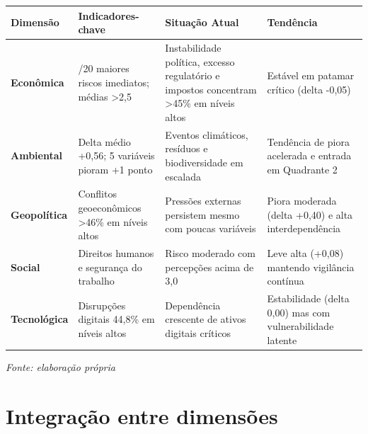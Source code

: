 \documentclass[
  portuguese,
  letterpaper,
  DIV=11,
  numbers=noendperiod]{scrreprt}
\begin{document}
\begin{longtable}[]{@{}
  >{\raggedright\arraybackslash}p{}
  >{\raggedright\arraybackslash}p{}
  >{\raggedright\arraybackslash}p{}
  >{\raggedright\arraybackslash}p{}@{}}
\toprule\noalign{}
\begin{minipage}[b]{\linewidth}\raggedright
\textbf{Dimensão}
\end{minipage} & \begin{minipage}[b]{\linewidth}\raggedright
\textbf{Indicadores-chave}
\end{minipage} & \begin{minipage}[b]{\linewidth}\raggedright
\textbf{Situação Atual}
\end{minipage} & \begin{minipage}[b]{\linewidth}\raggedright
\textbf{Tendência}
\end{minipage} \\
\midrule\noalign{}
\endhead
\bottomrule\noalign{}
\endlastfoot
\textbf{Econômica} & 13/20 maiores riscos imediatos; médias
\textgreater2,5 & Instabilidade política, excesso regulatório e impostos
concentram \textgreater45\% em níveis altos & Estável em patamar crítico
(delta -0,05) \\
\textbf{Ambiental} & Delta médio +0,56; 5 variáveis pioram +1 ponto &
Eventos climáticos, resíduos e biodiversidade em escalada & Tendência de
piora acelerada e entrada em Quadrante 2 \\
\textbf{Geopolítica} & Conflitos geoeconômicos \textgreater46\% em
níveis altos & Pressões externas persistem mesmo com poucas variáveis &
Piora moderada (delta +0,40) e alta interdependência \\
\textbf{Social} & Direitos humanos e segurança do trabalho & Risco
moderado com percepções acima de 3,0 & Leve alta (+0,08) mantendo
vigilância contínua \\
\textbf{Tecnológica} & Disrupções digitais 44,8\% em níveis altos &
Dependência crescente de ativos digitais críticos & Estabilidade (delta
0,00) mas com vulnerabilidade latente \\
\end{longtable}

\emph{Fonte: elaboração própria}

\section{Integração entre
dimensões}\label{integrauxe7uxe3o-entre-dimensuxf5es}
\end{document}
